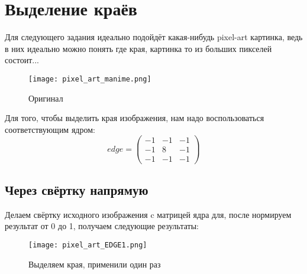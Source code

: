 \chapter{Выделение краёв}
\label{ch:chap4}


\lstset{style=mystyle}

Для следующего задания идеально подойдёт какая-нибудь pixel-art картинка, ведь в них идеально можно понять где края, 
картинка то из больших пикселей состоит...

\begin{figure}[ht]
    \centering
    \texttt{[image: pixel\_art\_manime.png]}
	\caption{Оригинал}
\end{figure}

Для того, чтобы выделить края изображения, нам надо воспользоваться соответствующим ядром:
$$
    edge = \begin{pmatrix}
        -1 & -1 & -1 \\
        -1 & 8 & -1 \\
    -1 & -1 & -1 
    \end{pmatrix}
$$

\section{Через свёртку напрямую}
Делаем свёртку исходного изображения c матрицей ядра для, после нормируем результат от 0 до 1, получаем следующие результаты:

\begin{figure}[ht]
    \centering
    \texttt{[image: pixel\_art\_EDGE1.png]}
	\caption{Выделяем края, применили один раз}
\end{figure}



